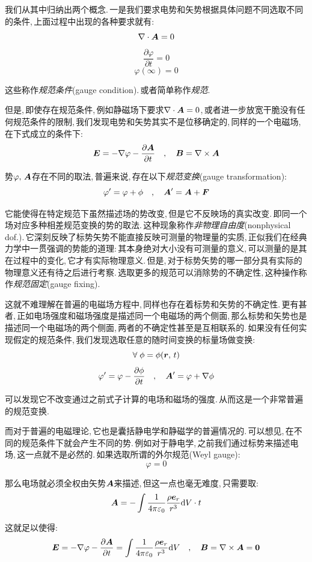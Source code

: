 我们从其中归纳出两个概念.\,一是我们要求电势和矢势根据具体问题不同选取不同的条件,\,上面过程中出现的各种要求就有:
\[\nabla\cdot\boldsymbol{A}=0\]
\[\frac{\partial \varphi}{\partial t}=0\]
\[\varphi(\infty)=0\]

这些称作\emph{规范条件}(gauge condition).\,或者简单称作\emph{规范}.

但是,\,即使存在规范条件,\,例如静磁场下要求$\nabla\cdot\boldsymbol{A}=0$,\,或者进一步放宽干脆没有任何规范条件的限制,\,我们发现电势和矢势其实不是位移确定的,\,同样的一个电磁场,\,在下式成立的条件下:
\[\boldsymbol{E}=-\nabla \varphi-\frac{\partial \boldsymbol{A}}{\partial t}\quad ,\quad\boldsymbol{B}=\nabla \times \boldsymbol{A}\]

势$\varphi,\,\boldsymbol{A}$存在不同的取法,\,普遍来说,\,存在以下\emph{规范变换}(gauge transformation):
\[\varphi'=\varphi+\phi\quad ,\quad  \boldsymbol{A}'=\boldsymbol{A}+\boldsymbol{F}\]

它能使得在特定规范下虽然描述场的势改变,\,但是它不反映场的真实改变.\,即同一个场对应多种相差规范变换的势的取法.\,这种现象称作\emph{非物理自由度}(nonphysical dof.).\,它深刻反映了标势矢势不能直接反映可测量的物理量的实质,\,正似我们在经典力学中一贯强调的势能的道理:\,其本身绝对大小没有可测量的意义,\,可以测量的是其在过程中的变化,\,它才有实际物理意义.\,但是,\,对于标势矢势的哪一部分具有实际的物理意义还有待之后进行考察.\,选取更多的规范可以消除势的不确定性,\,这种操作称作\emph{规范固定}(gauge fixing).

这就不难理解在普遍的电磁场方程中,\,同样也存在着标势和矢势的不确定性.\,更有甚者,\,正如电场强度和磁场强度是描述同一个电磁场的两个侧面,\,那么标势和矢势也是描述同一个电磁场的两个侧面,\,两者的不确定性甚至是互相联系的.\,如果没有任何实现假定的规范条件,\,我们发现选取任意的随时间变换的标量场做变换:
\[\forall\; \phi=\phi(\boldsymbol{r},\,t)\]
\[\varphi'=\varphi-\frac{\partial \phi}{\partial t}\quad ,\quad \boldsymbol{A}'=\varphi+\nabla\phi\]

可以发现它不改变通过之前式子计算的电场和磁场的强度.\,从而这是一个非常普遍的规范变换.

而对于普遍的电磁理论,\,它也是囊括静电学和静磁学的普遍情况的.\,可以想见,\,在不同的规范条件下就会产生不同的势.\,例如对于静电学,\,之前我们通过标势来描述电场,\,这一点就不是必然的.\,如果选取所谓的外尔规范(Weyl gauge):
\[\varphi=0\]

那么电场就必须全权由矢势$\boldsymbol{A}$来描述,\,但这一点也毫无难度,\,只需要取:
\[\boldsymbol{A}=-\int\frac{1}{4\pi\varepsilon_0} \frac{\rho\boldsymbol{e}_r}{r^3}\textrm{d} V\cdot t\]

这就足以使得:
\[\boldsymbol{E}=-\nabla \varphi-\frac{\partial \boldsymbol{A}}{\partial t}=\int\frac{1}{4\pi\varepsilon_0} \frac{\rho\boldsymbol{e}_r}{r^3}\textrm{d} V\quad ,\quad\boldsymbol{B}=\nabla \times \boldsymbol{A}=\boldsymbol{0}\]

